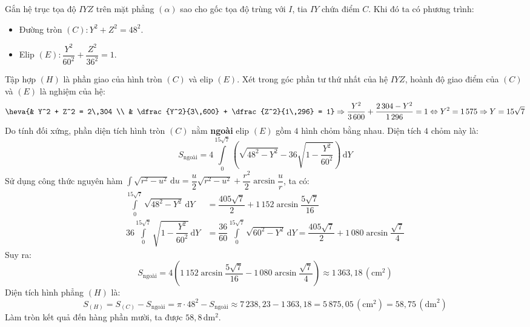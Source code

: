 \begin{ex}
{\begin{center}
		\end{center}
		Gắn hệ trục tọa độ $IYZ$ trên mặt phẳng $(\alpha)$ sao cho gốc tọa độ trùng với $I$, tia $IY$ chứa điểm $C$. Khi đó ta có phương trình:
		\begin{itemize}
			\item Đường tròn $(C)\colon Y^2 + Z^2 = 48^2$.
			\item Elip $(E)\colon \dfrac{Y^2}{60^2} + \dfrac{Z^2}{36^2} = 1$.
		\end{itemize}
		Tập hợp $(H)$ là phần giao của hình tròn $(C)$ và elip $(E)$. Xét trong góc phần tư thứ nhất của hệ $IYZ$, hoành độ giao điểm của $(C)$ và $(E)$ là nghiệm của hệ:
		\[ \heva{& Y^2 + Z^2 = 2\,304 \\ & \dfrac{Y^2}{3\,600} + \dfrac{Z^2}{1\,296} = 1} \Rightarrow \dfrac{Y^2}{3\,600} + \dfrac{2\,304 - Y^2}{1\,296} = 1 \Leftrightarrow Y^2 = 1\,575 \Rightarrow Y = 15\sqrt{7} \]
		Do tính đối xứng, phần diện tích hình tròn $(C)$ nằm \textbf{ngoài} elip $(E)$ gồm $4$ hình chỏm bằng nhau. Diện tích $4$ chỏm này là:
		\[ S_{\text{ngoài}} = 4 \displaystyle\int\limits_0^{15\sqrt{7}} \left( \sqrt{48^2 - Y^2} - 36\sqrt{1 - \dfrac{Y^2}{60^2}} \right) \mathrm{\,d}Y \]
		Sử dụng công thức nguyên hàm $\displaystyle\int \sqrt{r^2 - u^2} \mathrm{\,d}u = \dfrac{u}{2}\sqrt{r^2-u^2} + \dfrac{r^2}{2}\arcsin\dfrac{u}{r}$, ta có:
		\begin{align*} 
			\displaystyle\int\limits_0^{15\sqrt{7}} \sqrt{48^2 - Y^2} \mathrm{\,d}Y &= \dfrac{405\sqrt{7}}{2} + 1\,152\arcsin\dfrac{5\sqrt{7}}{16} \\ 
			36 \displaystyle\int\limits_0^{15\sqrt{7}} \sqrt{1 - \dfrac{Y^2}{60^2}} \mathrm{\,d}Y &= \dfrac{36}{60} \displaystyle\int\limits_0^{15\sqrt{7}} \sqrt{60^2 - Y^2} \mathrm{\,d}Y = \dfrac{405\sqrt{7}}{2} + 1\,080\arcsin\dfrac{\sqrt{7}}{4} 
		\end{align*}
		Suy ra:
		\[ S_{\text{ngoài}} = 4 \left( 1\,152\arcsin\dfrac{5\sqrt{7}}{16} - 1\,080\arcsin\dfrac{\sqrt{7}}{4} \right) \approx 1\,363{,}18 \,(\text{cm}^2) \]
		Diện tích hình phẳng $(H)$ là:
		\[ S_{(H)} = S_{(C)} - S_{\text{ngoài}} = \pi \cdot 48^2 - S_{\text{ngoài}} \approx 7\,238{,}23 - 1\,363{,}18 = 5\,875{,}05 \,(\text{cm}^2) = 58{,}75 \,(\text{dm}^2) \]
		Làm tròn kết quả đến hàng phần mười, ta được $58{,}8$\,dm$^2$.
	}
\end{ex}